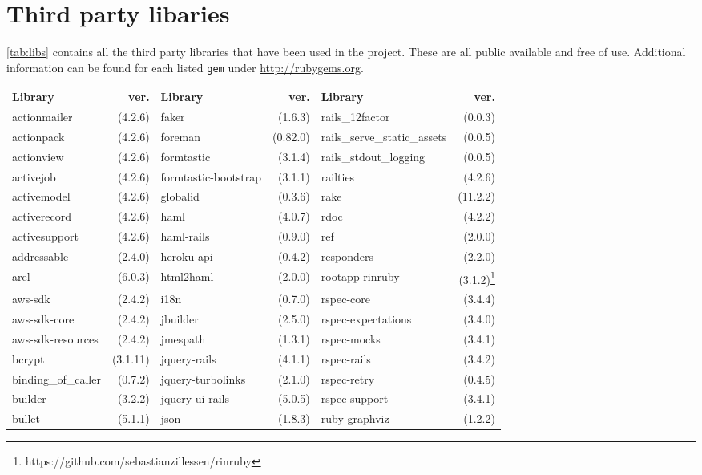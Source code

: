 {}

\section{Third party libaries}
\label{app:c}
\label{app:3rdparty}
\autoref{tab:libs} contains all the third party libraries that have been used in the project. These are all public available and free of use. Additional information can be found for each listed \texttt{gem} under \href{http://rubygems.org}{http://rubygems.org}.

\begin{table}[!h]
	\centering
	\begin{tabular}{|p{2.4cm}r||p{2.4cm}r||p{2.4cm}r|}
	\hline
	\textbf{Library} & \textbf{ver.} & 	\textbf{Library} & \textbf{ver.} & 	\textbf{Library} & \textbf{ver.} \\
	actionmailer&(4.2.6)&faker&(1.6.3)&rails\_12factor&(0.0.3)\\
actionpack&(4.2.6)&foreman&(0.82.0)&\tiny{rails\_serve\_static\_assets}&(0.0.5)\\
actionview&(4.2.6)&formtastic&(3.1.4)&\tiny{rails\_stdout\_logging}&(0.0.5)\\
activejob&(4.2.6)&\tiny{formtastic-bootstrap}&(3.1.1)&railties&(4.2.6)\\
activemodel&(4.2.6)&globalid&(0.3.6)&rake&(11.2.2)\\
activerecord&(4.2.6)&haml&(4.0.7)&rdoc&(4.2.2)\\
activesupport&(4.2.6)&haml-rails&(0.9.0)&ref&(2.0.0)\\
addressable&(2.4.0)&heroku-api&(0.4.2)&responders&(2.2.0)\\
arel&(6.0.3)&html2haml&(2.0.0)&\tiny{rootapp-rinruby}&(3.1.2)\footnote{https://github.com/sebastianzillessen/rinruby}\\
aws-sdk&(2.4.2)&i18n&(0.7.0)&rspec-core&(3.4.4)\\
aws-sdk-core&(2.4.2)&jbuilder&(2.5.0)&\tiny{rspec-expectations}&(3.4.0)\\
\tiny{aws-sdk-resources}&(2.4.2)&jmespath&(1.3.1)&rspec-mocks&(3.4.1)\\
bcrypt&(3.1.11)&jquery-rails&(4.1.1)&rspec-rails&(3.4.2)\\
\tiny{binding\_of\_caller}&(0.7.2)&\tiny{jquery-turbolinks}&(2.1.0)&rspec-retry&(0.4.5)\\
builder&(3.2.2)&jquery-ui-rails&(5.0.5)&rspec-support&(3.4.1)\\
bullet&(5.1.1)&json&(1.8.3)&ruby-graphviz&(1.2.2)\\

\end{tabular}
\end{table}
